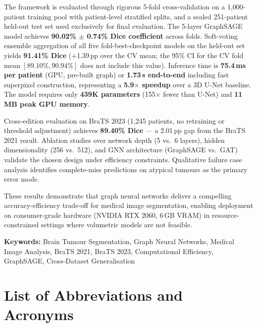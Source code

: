 \documentclass{article}
\begin{document}
The framework is evaluated through rigorous 5-fold cross-validation on a 1,000-patient training pool with patient-level stratified splits, and a sealed 251-patient held-out test set used exclusively for final evaluation. The 5-layer GraphSAGE model achieves \textbf{90.02\% $\pm$ 0.74\% Dice coefficient} across folds. Soft-voting ensemble aggregation of all five fold-best-checkpoint models on the held-out set yields \textbf{91.41\% Dice} (+1.39\,pp over the CV mean; the 95\% CI for the CV fold mean $[89.10\%, 90.94\%]$ does not include this value). Inference time is \textbf{75.4\,ms per patient} (GPU, pre-built graph) or \textbf{1.73\,s end-to-end} including fast superpixel construction, representing a \textbf{5.9$\times$ speedup} over a 3D U-Net baseline. The model requires only \textbf{439K parameters} (155$\times$ fewer than U-Net) and \textbf{11\,MB peak GPU memory}.

Cross-edition evaluation on BraTS 2023 (1,245 patients, no retraining or threshold adjustment) achieves \textbf{89.40\% Dice} — a 2.01\,pp gap from the BraTS 2021 result. Ablation studies over network depth (5 vs.\ 6 layers), hidden dimensionality (256 vs.\ 512), and GNN architecture (GraphSAGE vs.\ GAT) validate the chosen design under efficiency constraints. Qualitative failure case analysis identifies complete-miss predictions on atypical tumours as the primary error mode.

These results demonstrate that graph neural networks deliver a compelling accuracy-efficiency trade-off for medical image segmentation, enabling deployment on consumer-grade hardware (NVIDIA RTX 2060, 6\,GB VRAM) in resource-constrained settings where volumetric models are not feasible.

\textbf{Keywords:} Brain Tumour Segmentation, Graph Neural Networks, Medical Image Analysis, BraTS 2021, BraTS 2023, Computational Efficiency, GraphSAGE, Cross-Dataset Generalisation

\cleardoublepage

\section*{List of Abbreviations and Acronyms}
\end{document}
